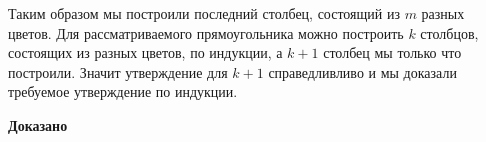 \documentclass[a4paper,12pt]{article} %
\begin{document}
Таким образом мы построили последний столбец, состоящий из $m$ разных цветов. Для рассматриваемого прямоугольника можно построить $k$ столбцов, состоящих из разных цветов, по индукции, а $k+1$ столбец мы только что построили. Значит утверждение для $k+1$ справедливливо и мы доказали требуемое утверждение по индукции.



\begin{flushright}
\begin{large}
\textbf {Доказано}
\end{large}
\end{flushright}
\end{document}
